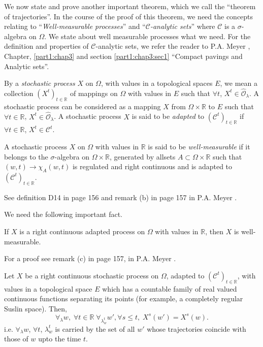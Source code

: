 We now state and prove another important theorem, which we call the
``theorem of trajectories''. In the course of the proof of this
theorem, we need the concepts relating to ``{\em Well-measurable
processes}'' and ``{\em $\mathscr{C}$-analytic sets}'' where
$\mathscr{C}$ is a $\sigma$-algebra on $\Omega$. We state about well
measurable processes what we need. For the definition and properties
of $\mathscr{C}$-analytic sets, we refer the reader to P.A. Meyer
\cite{key1}, Chapter, \ref{part1:chap3} and section
\ref{part1:chap3:sec1} ``Compact pavings and Analytic sets''.

By a {\em stochastic process} $X$ on $\Omega$, with values in a
topological spaces $E$, we mean a collection $(X^t)_{t \in
  \mathbb{R}}$ of mappings on $\Omega$ with values in $E$ such that
$\forall t$, $X^t \in\hat{\mathscr{O}}_\lambda$. A stochastic process
can be considered as a mapping $X$ from $\Omega \times \mathbb{R}$ to
$E$ such that $\forall t \in \mathbb{R}$, $X^t \in
\hat{\mathscr{O}}_\lambda$. A stochastic process $X$ is said to be
    {\em adapted} to $(\mathscr{C}^t)_{t \in \mathbb{R}}$ if $\forall t
      \in \mathbb{R}$, $X^t \in \mathscr{C}^t$. 

\begin{defn}\label{part2:chap6:def92}
A stochastic process $X$ on $\Omega$ with values in $\mathbb{R}$ is
said to be {\em well-measurable} if it belongs to the $\sigma$-algebra
on $\Omega \times \mathbb{R}$, generated by all\pageoriginale sets $A
\subset \Omega \times \mathbb{R}$ such that $(w,t) \to \chi_A(w,t)$
is regulated and right continuous and is adapted to
$(\mathscr{C}^t)_{t \in \mathbb{R}}$. 
\end{defn}

See definition D14 in page 156 and remark (b) in page 157 in
P.A. Meyer \cite{key1}. 

We need the following important fact.

If $X$ is a right continuous adapted process on $\Omega$ with values
in $\mathbb{R}$, then $X$ is well-measurable.

For a proof see remark (c) in page 157, in P.A. Meyer \cite{key1}.

\begin{thm}\label{part2:chap6:thm93}
Let $X$ be a right continuous stochastic process on $\Omega$, adapted
to $(\mathscr{C}^t)_{t \in \mathbb{R}}$, with values in a topological
space $E$ which has a countable family of real valued continuous
functions separating its points (for example, a completely regular
Suslin space). Then, 
$$
\forall_\lambda w, \; \forall t \in \mathbb{R} \;
\forall_{\lambda^t_w} w', \forall s \leq t, \; X^s (w') = X^s (w). 
$$
i.e. $\forall_\lambda w$, $\forall t$, $\lambda^t_w$ is carried by the
set of all $w'$ whose trajectories coincide with those of $w$ upto the
time $t$. 
\end{thm}

